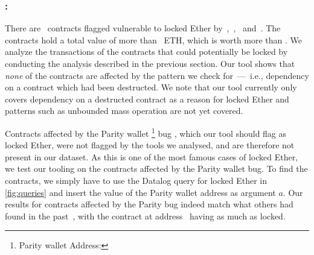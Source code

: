 % 

\subsubsection{\vle: \lockedether}
\label{ssec:analysis-le}
There are~ contracts flagged vulnerable to locked Ether by~\cite{Tsankov2018},~\cite{Grech2018},~\cite{Nikolic2018a} and~\cite{DBLP:conf/ndss/KalraGDS18}. The contracts hold a total value of more than~ ETH, which is worth more than . We analyze the transactions of the contracts that could potentially be locked by conducting the analysis described in the previous section. Our tool shows that \emph{none} of the contracts are affected by the pattern we check for~---~i.e., dependency on a contract which had been destructed.
We note that our tool currently only covers dependency on a destructed contract as a reason for locked Ether and patterns such as unbounded mass operation are not yet covered.

Contracts affected by the Parity wallet \footnote{Parity wallet Address: } bug \cite{Breidenbach}, which our tool should flag as locked Ether, were not flagged by the tools we analysed, and are therefore not present in our dataset.
As this is one of the most famous cases of locked Ether, we test our tooling on the contracts affected by the Parity wallet bug.
To find the contracts, we simply have to use the Datalog query for locked Ether in \autoref{fig:queries} and insert the value of the Parity wallet address as argument $a$. Our results for contracts affected by the Parity bug indeed match what others had found in the past~\cite{parity-wallet-freeze}, with the contract at address~ having as much as  locked.



